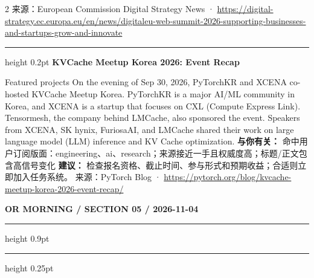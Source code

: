 \documentclass[10.5pt]{ctexart}
\begin{document}
\begin{multicols}{2}
{\footnotesize\color{ormuted} 来源：European Commission Digital Strategy News · \url{https://digital-strategy.ec.europa.eu/en/news/digitaleu-web-summit-2026-supporting-businesses-and-startups-grow-and-innovate}}
\vspace{2mm}
\hrule height 0.2pt
\vspace{2mm}
{\large\bfseries KVCache Meetup Korea 2026: Event Recap}\par
Featured projects On the evening of Sep 30, 2026, PyTorchKR and XCENA co-hosted KVCache Meetup Korea. PyTorchKR is a major AI/ML community in Korea, and XCENA is a startup that focuses on CXL (Compute Express Link). Tensormesh, the company behind LMCache, also sponsored the event. Speakers from XCENA, SK hynix, FuriosaAI, and LMCache shared their work on large language model (LLM) inference and KV Cache optimization.
\textbf{与你有关：} 命中用户订阅版面：engineering、ai、research；来源接近一手且权威度高；标题/正文包含高信号变化
\textbf{建议：} 检查报名资格、截止时间、参与形式和预期收益；合适则立即加入任务系统。
{\footnotesize\color{ormuted} 来源：PyTorch Blog · \url{https://pytorch.org/blog/kvcache-meetup-korea-2026-event-recap/}}
\end{multicols}
\newpage
{\small\bfseries OR MORNING / SECTION 05 / 2026-11-04}
\vspace{2mm}
\hrule height 0.9pt
\vspace{1.5mm}
\hrule height 0.25pt
\vspace{4mm}
\end{document}
